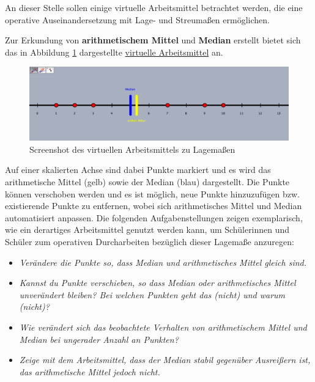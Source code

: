 \documentclass[
]{scrbook}
\providecommand{\tightlist}{%
  \setlength{\itemsep}{0pt}\setlength{\parskip}{0pt}}
\theoremstyle{definition}
\theoremstyle{definition}
\theoremstyle{definition}
\theoremstyle{definition}
\theoremstyle{remark}
\begin{document}
An dieser Stelle sollen einige virtuelle Arbeitsmittel betrachtet werden, die eine operative Auseinandersetzung mit Lage- und Streumaßen ermöglichen.

Zur Erkundung von \textbf{arithmetischem Mittel} und \textbf{Median} erstellt bietet sich das in Abbildung \ref{fig:ScreenshotLagemass} dargestellte \href{files/Stoffdidaktik-WiSe2223-Kap11-Lagemasse.html}{virtuelle Arbeitsmittel} an.

\begin{figure}

{\centering \includegraphics[width=0.75\linewidth]{pictures/11-ScreenshotLagemass} 

}

\caption{Screenshot des virtuellen Arbeitsmittels zu Lagemaßen}\label{fig:ScreenshotLagemass}
\end{figure}

Auf einer skalierten Achse sind dabei Punkte markiert und es wird das arithmetische Mittel (gelb) sowie der Median (blau) dargestellt. Die Punkte können verschoben werden und es ist möglich, neue Punkte hinzuzufügen bzw. existierende Punkte zu entfernen, wobei sich arithmetisches Mittel und Median automatisiert anpassen. Die folgenden Aufgabenstellungen zeigen exemplarisch, wie ein derartiges Arbeitsmittel genutzt werden kann, um Schülerinnen und Schüler zum operativen Durcharbeiten bezüglich dieser Lagemaße anzuregen:

\begin{itemize}
\tightlist
\item
  \emph{Verändere die Punkte so, dass Median und arithmetisches Mittel gleich sind.}
\item
  \emph{Kannst du Punkte verschieben, so dass Median oder arithmetisches Mittel unverändert bleiben? Bei welchen Punkten geht das (nicht) und warum (nicht)?}
\item
  \emph{Wie verändert sich das beobachtete Verhalten von arithmetischem Mittel und Median bei ungerader Anzahl an Punkten?}
\item
  \emph{Zeige mit dem Arbeitsmittel, dass der Median stabil gegenüber Ausreißern ist, das arithmetische Mittel jedoch nicht.}
\end{itemize}
\end{document}

